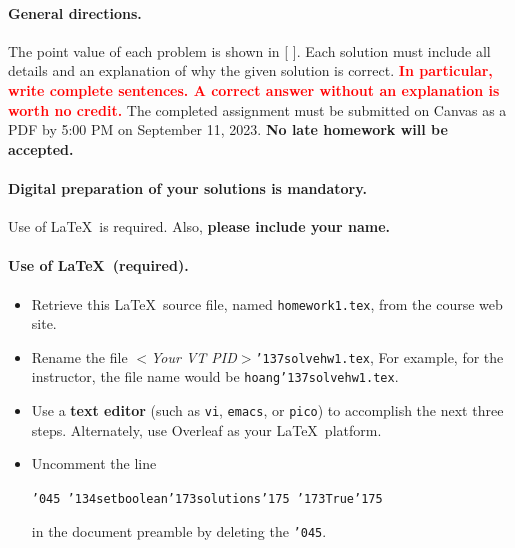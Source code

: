 \documentclass[11pt,twoside]{article}
\newcommand{\mybackslash}{\char'134}
\newcommand{\myleftbracket}{\char'173}
\newcommand{\myrightbracket}{\char'175}
\newcommand{\mypercent}{\char'045}
\newcommand{\myunderscore}{\char'137}
\newcommand{\duedate}{September 11, 2023}
\newcommand{\homeworknumber}{1}
\newcounter{problem}
\begin{document}
	{
		\begingroup %
		\paragraph{General directions.}
		The point value of each problem is shown in [ ].
		Each solution must include all details and
		an explanation of why the given solution is correct.
		\textbf{\textcolor{red}{In particular,
				write complete sentences.
				A correct answer without an explanation is worth no credit.}}
		The completed assignment must be submitted on Canvas as a PDF by 5:00 PM
		on \duedate.
		\textbf{No late homework will be accepted.}
		
		\paragraph{Digital preparation of your solutions is mandatory.}
		Use of \LaTeX\ is required.
		Also,
		\textbf{please include your name.}
		
		\paragraph{Use of \LaTeX\ (required).}
		\begin{itemize}
			\item Retrieve this \LaTeX\ source file,
			named
			\texttt{homework\homeworknumber.tex},
			from the course web site.
			\item Rename the file
			\textit{$<$Your VT PID$>$}\texttt{{\myunderscore}solvehw\homeworknumber.tex},
			For example,
			for the instructor,
			the file name would be
			\texttt{hoang{\myunderscore}solvehw\homeworknumber.tex}.
			
			\item
			Use a \textbf{text editor}
			(such as \texttt{vi}, \texttt{emacs}, or \texttt{pico})
			to accomplish the next three steps.
			Alternately,
			use Overleaf as your \LaTeX\ platform.
			
			\item
			Uncomment the line
			
			\texttt{{\mypercent} 
				{\mybackslash}setboolean{\myleftbracket}solutions{\myrightbracket}%
				{\myleftbracket}True{\myrightbracket}}
			
			in the document preamble by deleting the \texttt{\mypercent}.
			

\end{itemize}}
\end{document}
